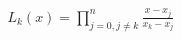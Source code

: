 \documentclass[preview]{standalone}
\begin{document}
\begin{align*}
L_k(x) = \prod_{j=0, j\neq k}^{n} \frac{x - x_j}{x_k - x_j}
\end{align*}
\end{document}
